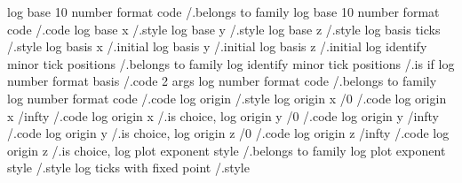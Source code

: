 log base 10 number format code                      /.belongs to family
log base 10 number format code                      /.code             
log base x                                          /.style            
log base y                                          /.style            
log base z                                          /.style            
log basis ticks                                     /.style            
log basis x                                         /.initial          
log basis y                                         /.initial          
log basis z                                         /.initial          
log identify minor tick positions                   /.belongs to family
log identify minor tick positions                   /.is if            
log number format basis                             /.code 2 args      
log number format code                              /.belongs to family
log number format code                              /.code             
log origin                                          /.style            
log origin x                     /0                 /.code
log origin x                     /infty             /.code
log origin x                                        /.is choice,       
log origin y                     /0                 /.code
log origin y                     /infty             /.code
log origin y                                        /.is choice,       
log origin z                     /0                 /.code
log origin z                     /infty             /.code
log origin z                                        /.is choice,       
log plot exponent style                             /.belongs to family
log plot exponent style                             /.style            
log ticks with fixed point                          /.style            

